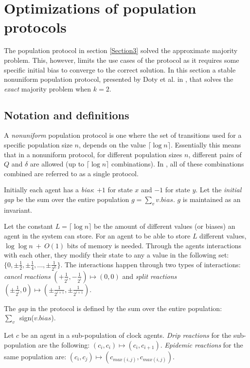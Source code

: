 \section{Optimizations of population protocols}
The population protocol in section \ref{Section3} solved the approximate majority problem. This, however, limits the use cases of the protocol as it requires some specific initial bias to converge to the correct solution.  In this section a stable nonuniform population protocol, presented by Doty et al. in \cite{dotyTimeSpaceOptimal2022}, that solves the \emph{exact} majority problem when $k = 2$. 

\subsection{Notation and definitions}

A \emph{nonuniform} population protocol is one where the set of transitions used for a specific population size $n$, depends on the value $\lceil \log n \rceil$. Essentially this means that in a nonuniform protocol, for different population sizes $n$, different pairs of $Q$ and $\delta$ are allowed (up to $\lceil \log n \rceil$ combinations). In \cite{dotyTimeSpaceOptimal2022}, all of these combinations combined are referred to as a single protocol. 

Initially each agent has a \emph{bias}: $+1$ for state $x$ and $-1$ for state $y$. Let the \emph{initial gap} be the sum over the entire population $g = \sum_v v.bias$. $g$ is maintained as an invariant. 

Let the constant $L = \lceil \log n \rceil$ be the amount of different values (or biases) an agent in the system can store. For an agent to be able to store $L$ different values, $\log \log n \ + \ O(1)$ bits of memory is needed. Through the agents interactions with each other, they modify their state to any a value in the following set: $\{ 0, \pm \frac{1}{2}, \pm \frac{1}{4}, ...,  \pm \frac{1}{2^L} \}$. The interactions happen through two types of interactions: \emph{cancel reactions} $(+\frac{1}{2^i}, -\frac{1}{2^i}) \mapsto (0, 0)$ and \emph{split reactions} $(\pm \frac{1}{2^i}, 0) \mapsto (\pm \frac{1}{2^{i + 1}}, \pm \frac{1}{2^{i + 1}})$.

The \emph{gap} in the protocol is defined by the sum over the entire population: \\ \mbox{$\sum_v$ sign($v.bias$)}.

Let $c$ be an agent in a sub-population of clock agents. \emph{Drip reactions} for the sub-population are the following: $(c_i, c_i) \mapsto (c_i, c_{i + 1})$. \emph{Epidemic reactions} for the same population are: $(c_i, c_j) \mapsto (c_{max(i, j)}, c_{max(i, j)})$.

